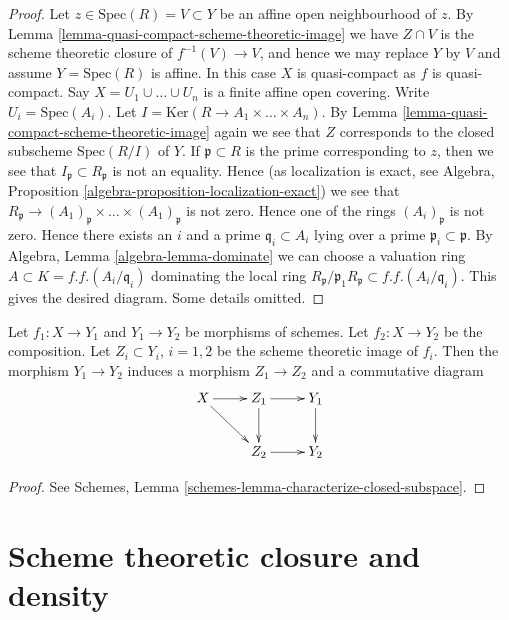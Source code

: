 \begin{proof}
Let $z \in \text{Spec}(R) = V \subset Y$ be an affine open
neighbourhood of $z$. By
Lemma \ref{lemma-quasi-compact-scheme-theoretic-image}
we have $Z \cap V$ is the scheme theoretic closure of
$f^{-1}(V) \to V$, and hence we may replace $Y$ by $V$
and assume $Y = \text{Spec}(R)$ is affine.
In this case $X$ is quasi-compact as $f$ is quasi-compact.
Say $X = U_1 \cup \ldots \cup U_n$
is a finite affine open covering. Write $U_i = \text{Spec}(A_i)$.
Let $I = \text{Ker}(R \to A_1 \times \ldots \times A_n)$.
By Lemma \ref{lemma-quasi-compact-scheme-theoretic-image}
again we see that $Z$ corresponds to the closed subscheme
$\text{Spec}(R/I)$ of $Y$. If $\mathfrak p \subset R$ is
the prime corresponding to $z$, then we see that
$I_{\mathfrak p} \subset R_{\mathfrak p}$ is not an
equality. Hence (as localization is exact, see
Algebra, Proposition \ref{algebra-proposition-localization-exact})
we see that
$R_{\mathfrak p} \to
(A_1)_{\mathfrak p} \times \ldots \times (A_1)_{\mathfrak p}$
is not zero. Hence one of the rings $(A_i)_{\mathfrak p}$ is not zero.
Hence there exists an $i$ and a prime $\mathfrak q_i \subset A_i$
lying over a prime $\mathfrak p_i \subset \mathfrak p$.
By Algebra, Lemma \ref{algebra-lemma-dominate} we can choose a valuation ring
$A \subset K = f.f.(A_i/\mathfrak q_i)$ dominating
the local ring
$R_{\mathfrak p}/\mathfrak p_1R_{\mathfrak p} \subset f.f.(A_i/\mathfrak q_i)$.
This gives the desired diagram. Some details omitted.
\end{proof}


\begin{lemma}
\label{lemma-factor-factor}
Let $f_1 : X \to Y_1$ and $Y_1 \to Y_2$ be morphisms of schemes.
Let $f_2 : X \to Y_2$ be the composition. Let $Z_i \subset Y_i$, $i = 1, 2$ be
the scheme theoretic image of $f_i$. Then the morphism
$Y_1 \to Y_2$ induces a morphism $Z_1 \to Z_2$ and a
commutative diagram
$$
\xymatrix{
X \ar[r] \ar[rd] & Z_1 \ar[d] \ar[r] & Y_1 \ar[d] \\
& Z_2 \ar[r] & Y_2
}
$$
\end{lemma}

\begin{proof}
See Schemes, Lemma \ref{schemes-lemma-characterize-closed-subspace}.
\end{proof}





\section{Scheme theoretic closure and density}
\label{section-scheme-theoretic-closure}

